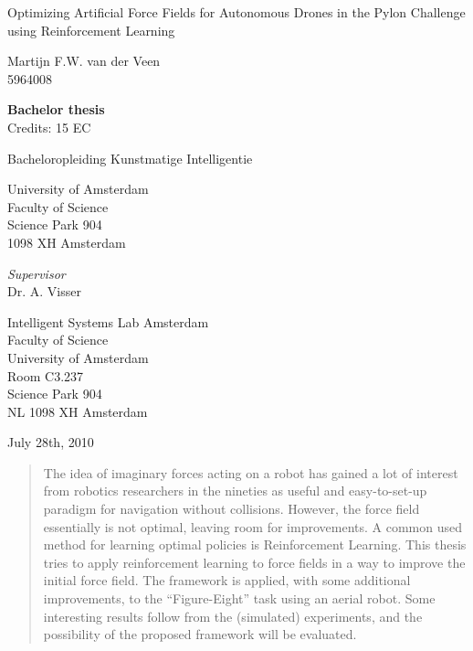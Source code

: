 \documentclass[11pt]{article}
\begin{document}
\begin{titlepage}
\begin{center}

\vspace{2.5cm}

\begin{huge}
Optimizing Artificial Force Fields for Autonomous Drones in the Pylon Challenge using Reinforcement Learning
\end{huge}

\vspace{1.5cm}
Martijn F.W. van der Veen\\
5964008

\vspace{1cm}
\textbf{Bachelor thesis}\\
Credits: 15 EC

\vspace{0.25cm}
Bacheloropleiding Kunstmatige Intelligentie

\vspace{0.25cm}
University of Amsterdam\\
Faculty of Science\\
Science Park 904\\
1098 XH Amsterdam

\vspace{2cm}
\emph{Supervisor}\\
Dr. A. Visser

\vspace{0.25cm}
Intelligent Systems Lab Amsterdam\\
Faculty of Science\\
University of Amsterdam\\
Room C3.237\\
Science Park 904\\
NL 1098 XH Amsterdam

\vspace{1.5cm}
July 28th, 2010

\end{center}
\end{titlepage}

\pagebreak



\thispagestyle{empty} %
\begin{abstract}
The idea of imaginary forces acting on a robot has gained a lot of interest from robotics researchers in the nineties as useful and easy-to-set-up paradigm for navigation without collisions. However, the force field essentially is not optimal, leaving room for improvements. A common used method for learning optimal policies is Reinforcement Learning. This thesis tries to apply reinforcement learning to force fields in a way to improve the initial force field. The framework is applied, with some additional improvements, to the ``Figure-Eight'' task using an aerial robot. Some interesting results follow from the (simulated) experiments, and the possibility of the proposed framework will be evaluated.
\end{abstract}
\end{document}
